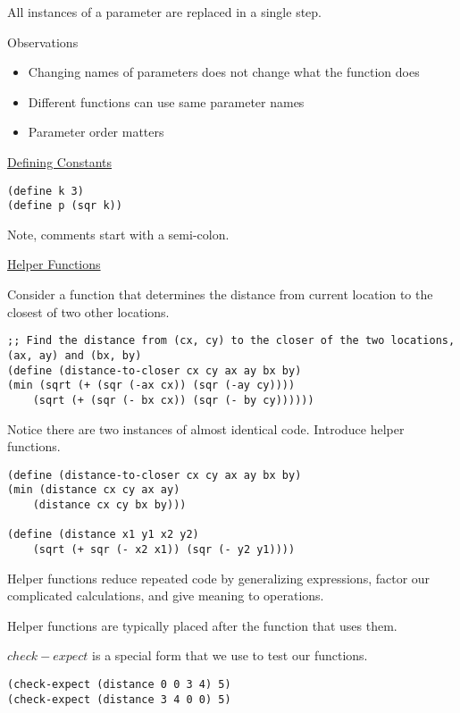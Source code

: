 \documentclass{article}
\begin{document}
All instances of a parameter are replaced in a single step. 

Observations
\begin{itemize}
    \item Changing names of parameters does not change what the function does
    \item Different functions can use same parameter names
    \item Parameter order matters
\end{itemize}

\underline{Defining Constants}

\begin{lstlisting}
(define k 3)
(define p (sqr k))
\end{lstlisting}

Note, comments start with a semi-colon. 

\underline{Helper Functions}

Consider a function that determines the distance from current location to the closest of two other locations. 
\begin{lstlisting}
;; Find the distance from (cx, cy) to the closer of the two locations, (ax, ay) and (bx, by)
(define (distance-to-closer cx cy ax ay bx by)
(min (sqrt (+ (sqr (-ax cx)) (sqr (-ay cy))))
    (sqrt (+ (sqr (- bx cx)) (sqr (- by cy))))))
\end{lstlisting}

Notice there are two instances of almost identical code. Introduce helper functions. 

\begin{lstlisting}
(define (distance-to-closer cx cy ax ay bx by)
(min (distance cx cy ax ay)
    (distance cx cy bx by)))

(define (distance x1 y1 x2 y2)
    (sqrt (+ sqr (- x2 x1)) (sqr (- y2 y1))))
\end{lstlisting}

Helper functions reduce repeated code by generalizing expressions, factor our complicated calculations, and give meaning to operations. 

Helper functions are typically placed after the function that uses them. 

$check-expect$ is a special form that we use to test our functions. 

\begin{lstlisting}
(check-expect (distance 0 0 3 4) 5)
(check-expect (distance 3 4 0 0) 5)
\end{lstlisting}
\end{document}
